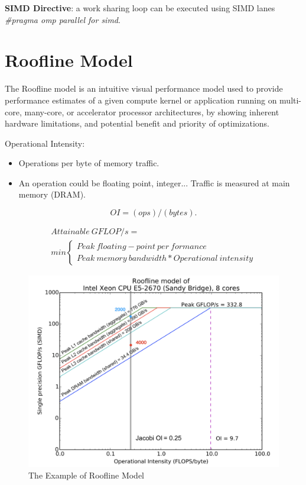 \documentclass{article}
\begin{document}
\textbf{SIMD Directive}: a work sharing loop can be executed using SIMD lanes \textit{\#pragma omp parallel for simd}.


\section{Roofline Model}

The Roofline model is an intuitive visual performance model used to provide performance estimates of a given compute kernel or application running on multi-core, many-core, or accelerator processor architectures, by showing inherent hardware limitations, and potential benefit and priority of optimizations.

Operational Intensity:

\begin{itemize}
    \item Operations per byte of memory traffic.
    \item An operation could be floating point, integer... Traffic is measured at main memory (DRAM).
\end{itemize}

\begin{equation}
    OI = (ops)/(bytes).
\end{equation}

\begin{multline}
Attainable\ GFLOP /s = \\
min \left\{\begin{matrix} Peak\ floating - point\ per\ formance \\ Peak\ memory\ bandwidth * Operational\ intensity \end{matrix}\right.
\end{multline}

\begin{figure}[h]
    \centering
    \includegraphics[scale=0.5]{images/roofline-model.png}
    \caption{The Example of Roofline Model}
    \label{fig:my_label}
\end{figure}
\end{document}
